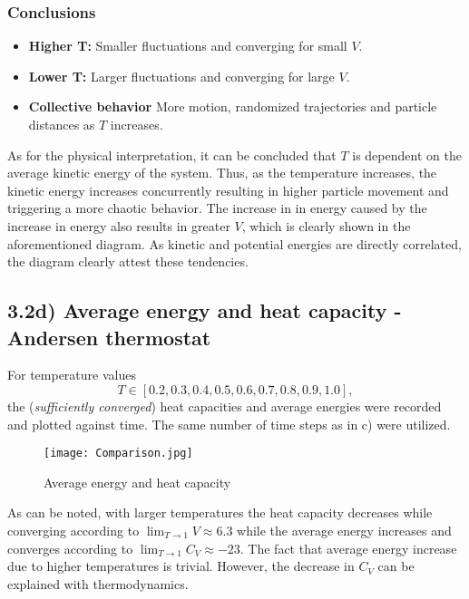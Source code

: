 \documentclass[12pt]{article}
\begin{document}
\subsubsection*{Conclusions}
\begin{itemize}
  \item \textbf{Higher T:} Smaller fluctuations and converging for small $V$.
  \item \textbf{Lower T:} Larger fluctuations and converging for large $V$.
  \item \textbf{Collective behavior} More motion, randomized trajectories and particle distances as $T$ increases.
\end{itemize}
As for the physical interpretation, it can be concluded that $T$ is dependent on the average kinetic energy of the system. Thus, as the temperature increases, the kinetic energy increases concurrently resulting in higher particle movement and triggering a more chaotic behavior. 
The increase in in energy caused by the increase in energy also results in greater $V$, which is clearly shown in the aforementioned diagram. As kinetic and potential energies are directly correlated, the diagram clearly attest these tendencies.

\newpage 
\subsection*{3.2d) Average energy and heat capacity - Andersen thermostat}
For temperature values 
\begin{equation*}
T \in [0.2, 0.3, 0.4, 0.5, 0.6, 0.7, 0.8, 0.9, 1.0],
\end{equation*}
the (\textit{sufficiently converged}) heat capacities and average energies were recorded and plotted against time. The same number of time steps as in c) were utilized.
\begin{figure*}[ht!]
\begin{center}
    \texttt{[image: Comparison.jpg]}
 \caption{Average energy and heat capacity}
\end{center}
\end{figure*}

\noindent As can be noted, with larger temperatures the heat capacity decreases while converging according to $\lim_{T\to 1} V \approx 6.3$ while the average energy increases and converges according to 
$\lim_{T\to 1} C_V \approx -23$. The fact that average energy increase due to higher temperatures is trivial. However, the decrease in $C_V$ can be explained with thermodynamics.
\vspace{0.3cm}
\end{document}
